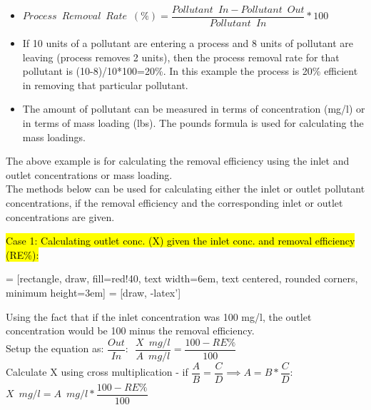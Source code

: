 \documentclass{article}
\begin{document}
\begin{enumerate}
\begin{itemize}
\item $Process \enspace Removal \enspace Rate \enspace (\%) = \dfrac{Pollutant \enspace  In-Pollutant\enspace  Out}{Pollutant \enspace In}*100$\\

\item If 10 units of a pollutant are entering a process and 8 units of pollutant are leaving (process removes 2 units), then the process removal rate for that pollutant is (10-8)/10*100=20\%.  In this example the process is 20\% efficient in removing that particular pollutant.

\item The amount of pollutant can be measured in terms of concentration (mg/l) or in terms of mass loading (lbs).  The pounds formula is used for calculating the mass loadings.  
\end{itemize}
The above example is for calculating the removal efficiency using the inlet and outlet concentrations or mass loading.\\
The methods below can be used for calculating either the inlet or outlet pollutant concentrations, if the removal efficiency and the corresponding inlet or outlet concentrations are given. 


\hl{Case 1:  Calculating outlet conc. (X) given the inlet conc. and removal efficiency (RE\%):}

 = [rectangle, draw, fill=red!40, 
    text width=6em, text centered, rounded corners, minimum height=3em]
 = [draw, -latex']
\begin{figure}[!h]
\centering
{}
\end{figure}
Using the fact that if the inlet concentration was 100 mg/l, the outlet concentration would be 100 minus the removal efficiency.\\
Setup the equation as:  $\dfrac{Out}{In}: \enspace \dfrac{X \enspace mg/l}{A \enspace mg/l}=\dfrac{100-RE\%}{100}$\\
Calculate X using cross multiplication - if $\dfrac{A}{B}=\dfrac{C}{D} \implies A=B*\dfrac{C}{D}$:\\
$X \enspace mg/l=A \enspace mg/l*\dfrac{100-RE\%}{100}$\\



\end{enumerate}
\end{document}
